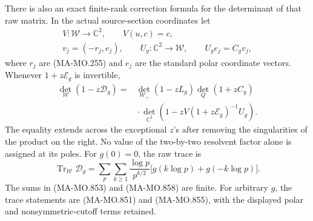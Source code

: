 There is also an exact finite-rank correction formula
for the determinant of that raw matrix. In the actual
source-section coordinates let
\[
 \begin{gathered}
 V:\mathcal W\longrightarrow\mathbb C^2,\qquad V(u,c)=c,\\
 v_j=(-r_j,e_j),\qquad
 U_g:\mathbb C^2\longrightarrow\mathcal W,\qquad
 U_ge_j=C_gv_j ,
 \end{gathered}
 \tag{MA-MO.856}
\]
where \(r_j\) are (MA-MO.255) and \(e_j\) are the
standard polar coordinate vectors. Whenever
\(1+z\mathscr E_g\) is invertible,
\[
 \begin{aligned}
 \det_{\mathcal W}(1-z\mathscr D_g)
    ={}&\det_{\mathcal W_+}(1-zL_g)\det_Q(1+zC_g)\\
      &{}\cdot
       \det_{\mathbb C^2}\!
        \left(1-zV(1+z\mathscr E_g)^{-1}U_g\right).
 \end{aligned}
 \tag{MA-MO.857}
\]
The equality extends across the exceptional \(z\)'s
after removing the singularities of the product on
the right. No value of the two-by-two resolvent factor
alone is assigned at its poles.
For \(g(0)=0\), the raw trace is
\[
 \operatorname{Tr}_{\mathcal W}\mathscr D_g
       =\sum_p\sum_{k\ge1}
             \frac{\log p}{p^{k/2}}
                 \bigl[g(k\log p)+g(-k\log p)\bigr].
 \tag{MA-MO.858}
\]
The sums in (MA-MO.853) and (MA-MO.858) are finite.
For arbitrary \(g\), the trace statements are
(MA-MO.851) and (MA-MO.855), with the displayed
polar and nonsymmetric-cutoff terms retained.

